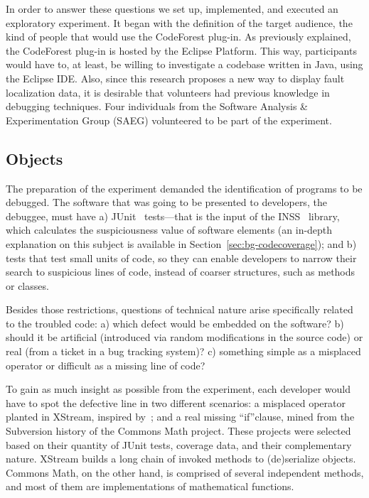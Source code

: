 In order to answer these questions we set up, implemented, and executed an
exploratory experiment. It began with the definition of the target audience, the
kind of people that would use the CodeForest plug-in. As previously explained, the
CodeForest plug-in is hosted by the Eclipse Platform.
This way,  participants would have to, at least, be willing to investigate a
codebase written in Java, using the Eclipse IDE. Also, since this research
proposes a new way to display fault localization data, it is desirable that
volunteers had previous knowledge in debugging techniques. Four individuals from
the Software Analysis \& Experimentation Group (SAEG) volunteered to be part of
the experiment.

\subsection{Objects}

The preparation of the experiment demanded the identification of programs to be
debugged. The software that was going to be presented to developers, the
debuggee, must have a) JUnit~\cite{gamma2006junit} tests---that is the input of the
INSS~\cite{souza2012depuracao} library, which calculates the suspiciousness
value of software elements (an in-depth explanation on this subject is available
in Section~\ref{sec:bg-codecoverage}); and b) tests that test small units of
code, so they can enable developers to narrow their search to suspicious lines
of code, instead of coarser structures, such as methods or classes.

Besides those restrictions, questions of technical nature arise specifically
related to the troubled code: a) which defect would be embedded on the software? b)
should it be artificial (introduced via random modifications in the source
code) or real (from a ticket in a bug tracking system)? c) something
simple as a misplaced operator or difficult as a missing line of code?

To gain as much insight as possible from the experiment, each developer would
have to spot the defective line in two different scenarios: a misplaced operator
planted in XStream, inspired by~\cite{campos2012gzoltar}; and a real missing
``if''clause, mined from the Subversion history of the Commons Math project.
These projects were selected based on their quantity of JUnit tests, coverage
data, and their complementary nature. XStream builds a long chain of invoked
methods to (de)serialize objects. Commons Math, on the other hand, is comprised
of several independent methods, and most of them are implementations of
mathematical functions.

